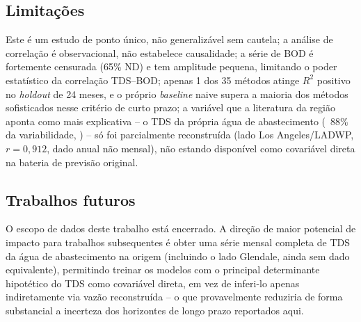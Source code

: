 \subsection{Limitações}

Este é um estudo de ponto único, não generalizável sem cautela; a análise de correlação é observacional, não estabelece causalidade; a série de BOD é fortemente censurada (65\% ND) e tem amplitude pequena, limitando o poder estatístico da correlação TDS--BOD; apenas 1 dos 35 métodos atinge $R^2$ positivo no \textit{holdout} de 24 meses, e o próprio \textit{baseline} naive supera a maioria dos métodos sofisticados nesse critério de curto prazo; a variável que a literatura da região aponta como mais explicativa -- o TDS da própria água de abastecimento (~88\% da variabilidade, \cite{scsc2018tds}) -- só foi parcialmente reconstruída (lado Los Angeles/LADWP, $r=0{,}912$, dado anual não mensal), não estando disponível como covariável direta na bateria de previsão original.

\subsection{Trabalhos futuros}

O escopo de dados deste trabalho está encerrado. A direção de maior potencial de impacto para trabalhos subsequentes é obter uma série mensal completa de TDS da água de abastecimento na origem (incluindo o lado Glendale, ainda sem dado equivalente), permitindo treinar os modelos com o principal determinante hipotético do TDS como covariável direta, em vez de inferi-lo apenas indiretamente via vazão reconstruída -- o que provavelmente reduziria de forma substancial a incerteza dos horizontes de longo prazo reportados aqui.
